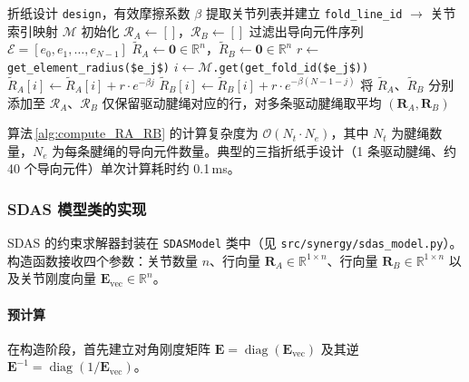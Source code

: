 \documentclass[12pt,a4paper]{report}
\newcommand{\R}{\mathbb{R}}
\begin{document}
\begin{algorithm}[htbp]
\caption{单侧传动矩阵 $\mathbf{R}_A$ 与 $\mathbf{R}_B$ 的计算}
\label{alg:compute_RA_RB}
\begin{algorithmic}[1]
\Require 折纸设计 \lstinline{design}，有效摩擦系数 $\beta$
\State 提取关节列表并建立 \lstinline{fold_line_id} $\to$ 关节索引映射 $\mathcal{M}$
\State 初始化 $\mathcal{R}_A \gets []$，$\mathcal{R}_B \gets []$
    \State 过滤出导向元件序列 $\mathcal{E} = [e_0, e_1, \dots, e_{N-1}]$
    \State $\tilde R_A \gets \mathbf{0} \in \R^{n}$，$\tilde R_B \gets \mathbf{0} \in \R^{n}$
        \State $r \gets$ \lstinline{get_element_radius($e_j$)}
        \State $i \gets \mathcal{M}$\lstinline{.get(get_fold_id($e_j$))}
            \State $\tilde R_A[i] \gets \tilde R_A[i] + r \cdot e^{-\beta j}$
            \State $\tilde R_B[i] \gets \tilde R_B[i] + r \cdot e^{-\beta (N-1-j)}$
        \EndIf
    \EndFor
    \State 将 $\tilde R_A$、$\tilde R_B$ 分别添加至 $\mathcal{R}_A$、$\mathcal{R}_B$
\EndFor
\State 仅保留驱动腱绳对应的行，对多条驱动腱绳取平均
\Return $(\mathbf{R}_A, \mathbf{R}_B)$
\end{algorithmic}
\end{algorithm}

算法\,\ref{alg:compute_RA_RB} 的计算复杂度为 $\mathcal{O}(N_t \cdot N_e)$，其中 $N_t$ 为腱绳数量，$N_e$ 为每条腱绳的导向元件数量。典型的三指折纸手设计（1 条驱动腱绳、约 40 个导向元件）单次计算耗时约 0.1\,ms。


\subsubsection{SDAS 模型类的实现}
\label{sec:sdas_class}

SDAS 的约束求解器封装在 \lstinline{SDASModel} 类中（见 \lstinline{src/synergy/sdas_model.py}）。构造函数接收四个参数：关节数量 $n$、行向量 $\mathbf{R}_A \in \R^{1 \times n}$、行向量 $\mathbf{R}_B \in \R^{1 \times n}$ 以及关节刚度向量 $\mathbf{E}_{\text{vec}} \in \R^{n}$。

\paragraph{预计算}

在构造阶段，首先建立对角刚度矩阵 $\mathbf{E} = \operatorname{diag}(\mathbf{E}_{\text{vec}})$ 及其逆 $\mathbf{E}^{-1} = \operatorname{diag}(1/\mathbf{E}_{\text{vec}})$。
\end{document}
